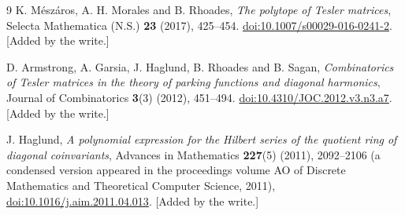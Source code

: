 \documentclass[11pt,a4paper]{article}
\theoremstyle{remark}\newtheorem{remark}[theorem]{Remark}
\numberwithin{equation}{section}
\begin{document}
\begin{thebibliography}{9}
K. M\'esz\'aros, A. H. Morales and B. Rhoades,
\emph{The polytope of Tesler matrices},
Selecta Mathematica (N.S.) \textbf{23} (2017), 425--454.
\href{https://doi.org/10.1007/s00029-016-0241-2}{doi:10.1007/s00029-016-0241-2}. [Added by the write.]

D. Armstrong, A. Garsia, J. Haglund, B. Rhoades and B. Sagan,
\emph{Combinatorics of Tesler matrices in the theory of parking functions and diagonal harmonics},
Journal of Combinatorics \textbf{3}(3) (2012), 451--494.
\href{https://doi.org/10.4310/JOC.2012.v3.n3.a7}{doi:10.4310/JOC.2012.v3.n3.a7}. [Added by the write.]

J. Haglund,
\emph{A polynomial expression for the Hilbert series of the quotient ring
of diagonal coinvariants}, Advances in Mathematics \textbf{227}(5) (2011),
2092--2106 (a condensed version appeared in the proceedings volume AO of
Discrete Mathematics and Theoretical Computer Science, 2011),
\href{https://doi.org/10.1016/j.aim.2011.04.013}{doi:10.1016/j.aim.2011.04.013}.
[Added by the write.]
\end{thebibliography}
\end{document}
